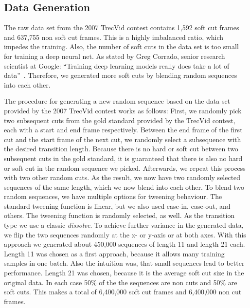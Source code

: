 \subsection{Data Generation}
\label{sec:soft_cut_data_generation}

The raw data set from the 2007 TrecVid contest contains 1,592 soft cut frames and 637,755 non soft cut frames.
This is a highly imbalanced ratio, which impedes the training.
Also, the number of soft cuts in the data set is too small for training a deep neural net.
As stated by Greg Corrado, senior research scientist at Google: ``Training deep learning models really does take a lot of data''~\cite{dataDeepNeuralNets}.
Therefore, we generated more soft cuts by blending random sequences into each other.

The procedure for generating a new random sequence based on the data set provided by the 2007 TrecVid contest works as follows:
First, we randomly pick two subsequent cuts from the gold standard provided by the TrecVid contest, each with a start and end frame respectively.
Between the end frame of the first cut and the start frame of the next cut, we randomly select a subsequence with the desired transition length.
Because there is no hard or soft cut between two subsequent cuts in the gold standard, it is guaranteed that there is also no hard or soft cut in the random sequence we picked.
Afterwards, we repeat this process with two other random cuts.
As the result, we now have two randomly selected sequences of the same length, which we now blend into each other.
To blend two random sequences, we have multiple options for tweening behaviour.
The standard tweening function is linear, but we also used ease-in, ease-out, and others.
The tweening function is randomly selected, as well.
As the transition type we use a classic \textit{dissolve}.
To achieve further variance in the generated data, we flip the two sequences randomly at the x- or y-axis or at both axes.
With this approach we generated about 450,000 sequences of length 11 and length 21 each.
Length 11 was chosen as a first approach, because it allows many training samples in one batch.
Also the intuition was, that small sequences lead to better performance.
Length 21 was chosen, because it is the average soft cut size in the original data.
In each case 50\% of the the sequences are non cuts and 50\% are soft cuts.
This makes a total of 6,400,000 soft cut frames and 6,400,000 non cut frames.
